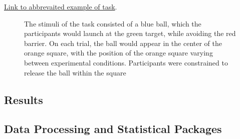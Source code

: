 \documentclass[
  12pt,
  letterpaper,
]{article}
\begin{document}
\href{https://pcl.sitehost.iu.edu/tg/demos/igas_expt1_demo.html}{Link to
abbrevaited example of task}.

\begin{figure}


\caption{\label{fig-IGAS_Methods}The stimuli of the task consisted of a
blue ball, which the participants would launch at the green target,
while avoiding the red barrier. On each trial, the ball would appear in
the center of the orange square, with the position of the orange square
varying between experimental conditions. Participants were constrained
to release the ball within the square}

\end{figure}%

\subsection{Results}\label{results}

\subsection{Data Processing and Statistical
Packages}\label{data-processing-and-statistical-packages}
\end{document}
